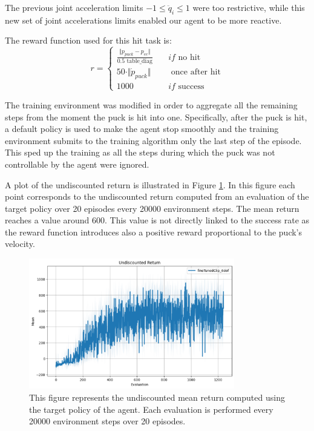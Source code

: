 The previous joint acceleration limits $-1 \le \ddot{q}_i \le 1$ were too restrictive, 
while this new set of joint accelerations limits enabled our agent to be more reactive.

The reward function used for this hit task is:
\begin{equation}
    r = \left\{
        \begin{aligned}
            \frac{\Vert p_{puck} - p_{ee} \Vert}{0.5 \text{ table\_diag}} \quad &if \text{ no hit} \\
            50 \cdot \Vert \dot{p}_{puck} \Vert \quad &\text{ once after hit} \\
            1000 \quad &if \text{ success}
        \end{aligned}
    \right.
\end{equation}

The training environment was modified in order to aggregate all the remaining steps from the moment the puck is hit into one. Specifically, after the puck
is hit, a default policy is used to make the agent stop smoothly and the training environment submits to the training algorithm only the last step of the episode.
This sped up the training as all the steps during which the puck was not controllable by the agent were ignored.

A plot of the undiscounted return is illustrated in Figure \ref{fig:undiscounted_return}.
In this figure each point corresponds to the undiscounted return computed from an evaluation of the target policy over 20 episodes every 20000 environment steps.
The mean return reaches a value around 600. This value is not directly linked to the success rate as the reward function introduces also a positive reward proportional to the puck's velocity.

\begin{figure}
    \centering
    \includegraphics[width=0.8\textwidth]{Images/undiscounted_return.pdf}
    \caption[Undiscounted return.]{This figure represents the undiscounted mean return computed using the target policy of the agent.
    Each evaluation is performed every 20000 environment steps over 20 episodes.}
    \label{fig:undiscounted_return}
\end{figure}

